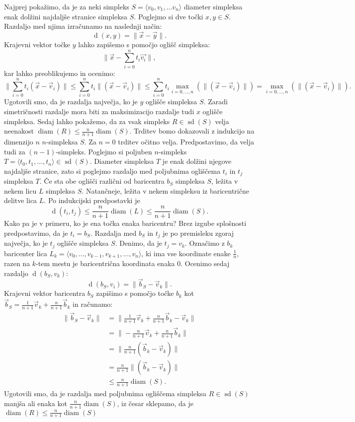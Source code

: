 \documentclass[mat1]{fmfdelo}
\DeclareMathOperator{\diam}{diam}
\DeclareMathOperator{\sd}{sd}
\DeclareMathOperator{\dist}{d}
\newcommand{\0}{\underline{0}}
\begin{document}
\begin{dokaz}
Najprej pokažimo, da je za neki simpleks $S = \langle v_0, v_1, \dots v_n \rangle$ diameter simpleksa enak dolžini najdaljše stranice simpleksa $S$. Poglejmo si dve točki $x, y \in S$. Razdaljo med njima izračunamo na naslednji način:
$$\dist(x, y) = \| \vec{x} - \vec{y} \|.$$
Krajevni vektor točke $y$ lahko zapišemo s pomočjo oglišč simpleksa:
$$\| \vec{x} - \sum_{i=0}^n t_i \vec{v_i} \|,$$
kar lahko preoblikujemo in ocenimo:
$$\| \sum_{i=0}^n t_i (\vec{x} - \vec{v}_i)\| \leq \sum_{i=0}^n t_i \| (\vec{x} - \vec{v}_i) \| \leq \sum_{i=0}^n t_i \max_{i=0, \dots, n}(\| (\vec{x} - \vec{v}_i) \|) = \max_{i=0, \dots, n}(\| (\vec{x} - \vec{v}_i) \|).$$
Ugotovili smo, da je razdalja največja, ko je $y$ oglišče simpleksa $S$. Zaradi simetričnosti razdalje mora biti za maksimizacijo razdalje tudi $x$ oglišče simpleksa.
Sedaj lahko pokažemo, da za vsak simpleks $R \in \sd(S)$ velja neenakost $\diam(R) \leq \frac{n}{n + 1} \diam(S)$.
Trditev bomo dokazovali z indukcijo na dimenzijo $n$ $n$-simpleksa $S$. Za $n = 0$ trditev očitno velja. Predpostavimo, da velja tudi za $(n-1)$-simpleks. Poglejmo si poljuben $n$-simpleks $T = \langle t_0, t_1, \dots, t_n \rangle \in \sd(S)$. Diameter simpleksa $T$ je enak dolžini njegove najdaljše stranice, zato si poglejmo razdaljo med poljubnima ogliščema $t_i$ in $t_j$ simpleksa $T$. Če sta obe oglišči različni od baricentra $b_S$ simpleksa $S$, ležita v nekem licu $L$ simpleksa $S$. Natančneje, ležita v nekem simpleksu iz baricentrične delitve lica $L$. Po indukcijski predpostavki je
$$\dist(t_i, t_j) \leq \frac{n}{n + 1} \diam(L) \leq \frac{n}{n + 1} \diam(S).$$
Kako pa je v primeru, ko je ena točka enaka baricentru? Brez izgube splošnosti predpostavimo, da je $t_i = b_S$. Razdalja med $b_S$ in $t_j$ je po premisleku zgoraj največja, ko je $t_j$ oglišče simpleksa $S$. Denimo, da je $t_j = v_k$. Označimo z $b_k$ baricenter lica $L_k = \langle v_0, \dots, v_{k-1}, v_{k+1}, \dots, v_n \rangle$, ki ima vse koordinate enake $\frac{1}{n}$, razen na $k$-tem mestu je baricentrična koordinata enaka $0$. Ocenimo sedaj razdaljo $\dist(b_S, v_k)$:
$$\dist(b_S, v_i) = \|\vec{b}_S - \vec{v}_k \|.$$
Krajevni vektor baricentra $b_S$ zapišimo s pomočjo točke $b_k$ kot $\vec{b}_S = \frac{1}{n+1} \vec{v}_k + \frac{n}{n+1} \vec{b}_k$ in računamo:
\begin{align*}
\|\vec{b}_S - \vec{v}_k \| &= \| \frac{1}{n+1} \vec{v}_k + \frac{n}{n+1} \vec{b}_k - \vec{v}_k \| \\
&= \| -\frac{n}{n+1} \vec{v}_k + \frac{n}{n+1} \vec{b}_k\| \\
&= \| \frac{n}{n+1} (\vec{b}_k - \vec{v}_k)\| \\
&= \frac{n}{n+1} \|(\vec{b}_k - \vec{v}_k)\| \\
& \leq \frac{n}{n+1} \diam(S).
\end{align*}
Ugotovili smo, da je razdalja med poljubnima ogliščema simpleksa $R \in \sd(S)$ manjša ali enaka kot $\frac{n}{n+1} \diam(S)$, iz česar sklepamo, da je $\diam(R) \leq \frac{n}{n+1} \diam(S)$ 
\end{dokaz}
\end{document}
